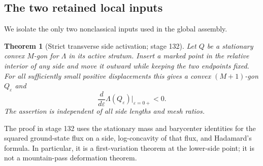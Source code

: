 \documentclass[11pt]{amsart}
\numberwithin{equation}{section}
\newtheorem{theorem}{Theorem}[section]
\theoremstyle{definition}
\theoremstyle{remark}
\newcommand{\LambdaF}{\Lambda}
\begin{document}
\subsection{The two retained local inputs}

We isolate the only two nonclassical inputs used in the global assembly.

\begin{theorem}[Strict transverse side activation; stage 132]
\label{G0:thm:activation}
Let $Q$ be a stationary convex $M$-gon for $\LambdaF$ in its active
stratum.  Insert a marked point in the relative interior of any side and
move it outward while keeping the two endpoints fixed.  For all
sufficiently small positive displacements this gives a convex
$(M+1)$-gon $Q_\varepsilon$ and
\begin{equation}\label{G0:eq:activation}
 \frac d{d\varepsilon}\LambdaF(Q_\varepsilon)
 \bigg|_{\varepsilon=0+}<0.
\end{equation}
The assertion is independent of all side lengths and mesh ratios.
\end{theorem}

The proof in stage 132 uses the stationary mass and barycenter identities
for the squared ground-state flux on a side, log-concavity of that flux,
and Hadamard's formula.  In particular, it is a first-variation theorem at
the lower-side point; it is not a mountain-pass deformation theorem.
\end{document}

